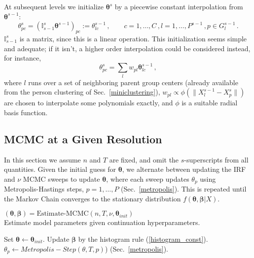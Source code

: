 \documentclass{article}
\newcommand{\bbeta}{\boldsymbol\beta}
\newcommand{\bta}{\boldsymbol\ta}
\newcommand{\ta}{\theta}
\newcommand{\lla}{\longleftarrow}
\newcommand{\I}{\mathbb{I}}
\begin{document}
At subsequent levels we initialize $\bta^s$ by a piecewise constant interpolation from $\bta^{s-1}$:
\begin{equation}
	\ta^s_{pc} = \left(\I_{s-1}^s \bta^{s-1}\right)_{pc} := \ta^{s-1}_{lc}\,,\qquad c=1,\dots,C\,, l=1,\dots,P^{s-1}\,,p \in G^{s-1}_l\,.
	\label{interpolate}
\end{equation}
$\I_{s-1}^s$ is a matrix, since this is a linear operation. This initialization seems simple and adequate; if it isn't, a higher order interpolation could be considered instead, for instance,
\begin{equation}
	\ta^s_{pc} = \sum_l w_{pl} \bta^{s-1}_{lc}\,,
\end{equation}
where $l$ runs over a set of neighboring parent group centers (already available from the person clustering of Sec.~\ref{miniclustering}), $w_{pl} \propto \phi(\|X^{s-1}_l-X^s_p\|)$ are chosen to interpolate some polynomials exactly, and $\phi$ is a suitable radial basis function.

\subsection{MCMC at a Given Resolution}
In this section we assume $n$ and $T$ are fixed, and omit the $s$-superscripts from all quantities. Given the initial guess for $\bta$, we alternate between updating the IRF and $\nu$ MCMC sweeps to update $\bta$, where each sweep updates $\ta_p$ using Metropolis-Hastings steps, $p=1,\dots,P$ (Sec.~\ref{metropolis}). This is repeated until the Markov Chain converges to the stationary distribution $f(\bta,\bbeta|X)$.

\begin{algorithm}
\caption[]{$(\bta, \bbeta) = {\mbox{Estimate-MCMC}}(n, T, \nu, \bta_{init})$\\\hspace{\textwidth}
Estimate model parameters given continuation hyperparameters.}
\begin{algorithmic}
	\label{mcmc}
    \STATE Set $\bta \lla \bta_{init}$.
    	\STATE Update $\bbeta$ by the histogram rule (\ref{histogram_const}).
	    		\STATE $\ta_p \lla Metropolis-Step(\ta, T, p)$) (Sec.~\ref{metropolis}).
	    	\ENDFOR
    	\ENDFOR
    \ENDWHILE
\end{algorithmic}
\end{algorithm}
\end{document}
